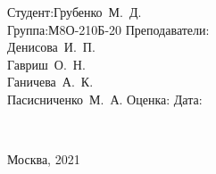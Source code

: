 \vspace{1em}
{
	\hfill\parbox{11cm}{
		\hspace*{10cm}\hspace*{-5cm}Студент:\hfill\hbox {Грубенко М. Д. \hfill}\\
		\hspace*{10cm}\hspace*{-5cm}Группа:\hfill\hbox {М8О-210Б-20}\vspace{2mm}
		\hspace*{10cm}\hspace*{-5cm}Преподаватели:\\
		\hspace*{10cm}\hspace*{-5cm}\hfill\hbox {Денисова И. П.}\\
		\hspace*{10cm}\hspace*{-5cm}\hfill\hbox {Гавриш О. Н.}\\
		\hspace*{10cm}\hspace*{-5cm}\hfill\hbox {Ганичева А. К.}\\
		\hspace*{10cm}\hspace*{-5cm}\hfill\hbox {Пасисниченко М. А.}\vspace{2mm}
		\hspace*{10cm}\hspace*{-5cm}Оценка:\hfill\hbox {}\vspace{2mm}
		\hspace*{10cm}\hspace*{-5cm}Дата:\hfill\hbox {}\\
	}
\\}
\vspace{\fill}
\centerline{Москва, 2021}